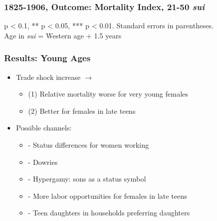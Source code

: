 \begin{frame}[label = results21to50]
\frametitle{1825-1906, Outcome: Mortality Index, 21-50 \emph{sui} \hyperlink{datadefs}{} \hyperlink{sumstats21to50}{}}
\begin{table}\centering
{}
\end{table}
\parbox{\linewidth}{\tiny * p < 0.1, ** p < 0.05, *** p < 0.01. Standard errors in parentheses.\\
Age in \emph{sui} = Western age + 1.5 years
}
\end{frame}



\begin{frame}
\frametitle{Results: Young Ages  \hyperlink{robustness}{}}
\begin{itemize}
\item Trade shock increase $\rightarrow$ 

\begin{itemize}
\item (1) Relative mortality worse for very young females
\item (2) Better for females in late teens
\end{itemize}
\pause
\item Possible channels:
{\small
\begin{itemize}
\item - Status differences for women working
\item - Dowries
\item - Hypergamy: sons as a status symbol
\item - More labor opportunities for females in late teens
\item - Teen daughters in households preferring daughters 
\end{itemize}
}

\end{itemize}
\end{frame}


